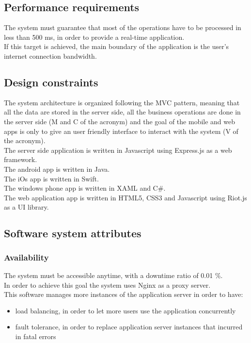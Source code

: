 \subsection{Performance requirements}
The system must guarantee that most of the operations have to be processed in less than 500 ms, in order to provide a real-time application.\\
If this target is achieved, the main boundary of the application is the user’s internet connection bandwidth.

\subsection{Design constraints}
The system architecture is organized following the MVC pattern, meaning that all the data are stored in the server side, all the business operations are done in the server side (M and C of the acronym) and the goal of the mobile and web apps is only to give an user friendly interface to interact with the system (V of the acronym).\\
The server side application is written in Javascript using Express.js as a web framework.\\
The android app is written in Java.\\
The iOs app is written in Swift.\\
The windows phone app is written in XAML and C\#.\\
The web application app is written in HTML5, CSS3 and Javascript using Riot.js as a UI library.

\subsection{Software system attributes}

\subsubsection{Availability}
The system must be accessible anytime, with a downtime ratio of 0.01 \%.\\
In order to achieve this goal the system uses Nginx as a proxy server.\\
This software manages more instances of the application server in order to have:
\begin{itemize}
\item load balancing, in order to let more users use the application concurrently
\item fault tolerance, in order to replace application server instances that incurred in fatal errors
\end{itemize}
